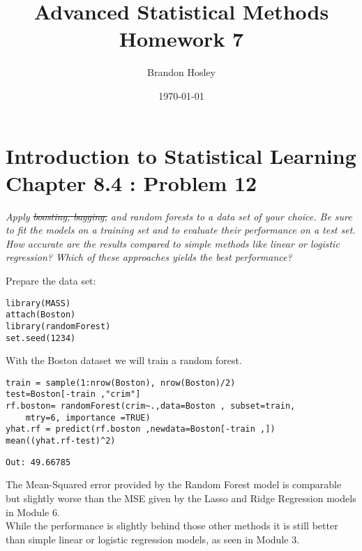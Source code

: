 \documentclass[a4paper,man,natbib]{apa6}
\title{Advanced Statistical Methods Homework 7}
\author{Brandon Hosley}
\date{\today}
\affiliation{University of Illinois - Springfield}
\begin{document}
\maketitle
\singlespacing

\section{Introduction to Statistical Learning \\ Chapter 8.4 : Problem 12}
\normalem
\emph{Apply \sout{boosting, bagging,} and random forests to a data set of your
	choice. Be sure to fit the models on a training set and to evaluate their
	performance on a test set. How accurate are the results compared
	to simple methods like linear or logistic regression? Which of these
	approaches yields the best performance?} \vspace{1em}

Prepare the data set:

\begin{verbatim}
library(MASS)
attach(Boston)
library(randomForest)
set.seed(1234)
\end{verbatim}

With the Boston dataset we will train a random forest.

\begin{verbatim}
train = sample(1:nrow(Boston), nrow(Boston)/2)
test=Boston[-train ,"crim"]
rf.boston= randomForest(crim~.,data=Boston , subset=train, 
	mtry=6, importance =TRUE)
yhat.rf = predict(rf.boston ,newdata=Boston[-train ,])
mean((yhat.rf-test)^2)
\end{verbatim}
\vspace{-1em}
\begin{verbatim}
Out: 49.66785
\end{verbatim}

The Mean-Squared error provided by the Random Forest model is comparable but slightly worse than the MSE given by the Lasso and Ridge Regression models in Module 6. \\
While the performance is slightly behind those other methods it is still better than simple linear or logistic regression models, as seen in Module 3. \\
\end{document}
